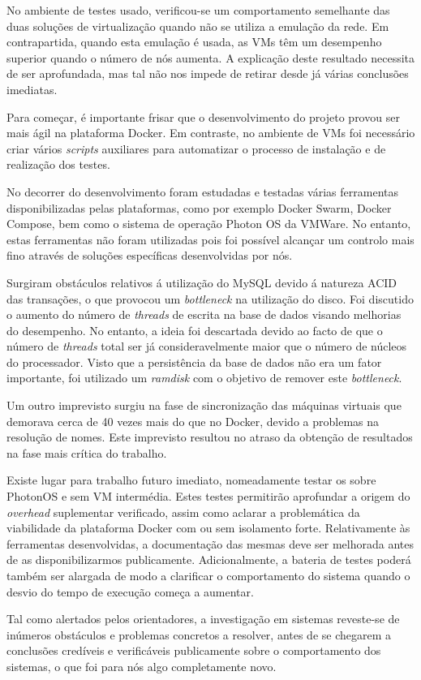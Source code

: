 No ambiente de testes usado, verificou-se um comportamento semelhante das duas soluções de
virtualização quando não se utiliza a emulação da rede. Em contrapartida, quando esta emulação
é usada, as VMs têm um desempenho superior quando o número de nós aumenta. A explicação deste resultado
necessita de ser aprofundada, mas tal não nos impede de retirar desde já várias conclusões imediatas.

Para começar, é importante frisar que o desenvolvimento do projeto provou ser mais ágil na plataforma Docker. 
Em contraste, no ambiente de VMs foi necessário criar vários \textit{scripts} auxiliares para
automatizar o processo de instalação e de realização dos testes.

No decorrer do desenvolvimento foram estudadas e testadas várias ferramentas disponibilizadas pelas plataformas, 
como por exemplo Docker Swarm, Docker Compose, bem como o sistema de operação 
Photon OS da VMWare. 
No entanto, estas ferramentas não foram utilizadas pois foi possível alcançar um controlo mais fino através de soluções
específicas desenvolvidas por nós.

Surgiram obstáculos relativos á utilização do MySQL devido á natureza  ACID
das transações, o que provocou um \textit{bottleneck} na utilização do disco.
Foi discutido o aumento do número de \textit{threads} de escrita na base de dados visando melhorias do desempenho. No entanto,
a ideia foi descartada 
devido ao facto de que o número de \textit{threads} total ser já consideravelmente maior que o número de núcleos do processador. 
Visto que a persistência da base de dados não era um fator importante, 
foi utilizado um \textit{ramdisk} com o objetivo de remover este \textit{bottleneck}.

Um outro imprevisto surgiu na fase de sincronização das máquinas virtuais que
demorava cerca de 40 vezes mais do que no 
Docker, devido a problemas na resolução de nomes.
Este imprevisto resultou no atraso da obtenção de resultados na fase mais crítica do trabalho.

Existe lugar para trabalho futuro imediato, nomeadamente testar os {\conts} sobre PhotonOS
e sem VM intermédia. Estes testes permitirão aprofundar a origem do \textit{overhead} suplementar verificado,
assim como aclarar a problemática da viabilidade da plataforma Docker com ou sem isolamento forte.
Relativamente às ferramentas desenvolvidas, a documentação das mesmas deve ser melhorada antes de as
disponibilizarmos publicamente. Adicionalmente, a bateria de testes poderá também ser alargada de modo a
clarificar o comportamento do sistema quando o desvio do tempo de execução começa a aumentar.

Tal como alertados pelos orientadores, a investigação em sistemas reveste-se de inúmeros obstáculos
e problemas concretos a resolver, antes de se chegarem a conclusões credíveis e verificáveis publicamente
sobre o comportamento dos sistemas, o que foi para nós algo
completamente novo.
